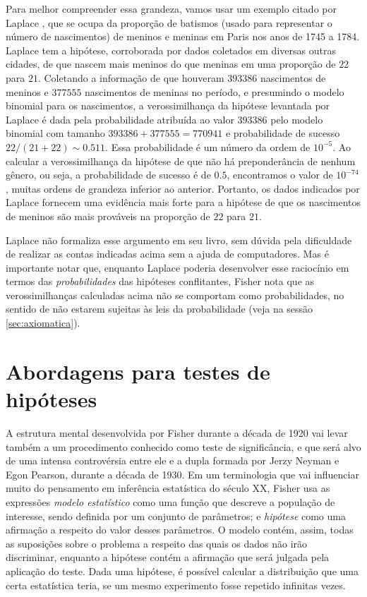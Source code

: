 Para melhor compreender essa grandeza, vamos usar um exemplo citado por Laplace \citep{Laplace1814}, que se ocupa da 
proporção de batismos (usado para representar o número de nascimentos) de meninos e meninas em Paris nos anos 
de 1745 a 1784. Laplace tem a hipótese, corroborada por dados coletados em diversas outras cidades, de que nascem mais meninos
do que meninas em uma proporção de $22$ para $21$. Coletando a informação de que houveram $393386$ nascimentos de 
meninos e $377555$
nascimentos de meninas no período, e presumindo o modelo binomial para os nascimentos, a verossimilhança da hipótese levantada
por Laplace é dada pela probabilidade atribuída ao valor $393386$ pelo modelo binomial com tamanho $393386 + 377555 = 770941$
e probabilidade de sucesso $22/(21+22) \sim 0.511$. Essa probabilidade é um número da ordem de $10^{-5}$. Ao calcular a 
verossimilhança da hipótese de que não há preponderância de nenhum gênero, ou seja, a probabilidade de sucesso é de $0.5$, 
encontramos o valor de $10^{-74}$, muitas ordens de grandeza inferior ao anterior. Portanto, os dados indicados por Laplace
fornecem uma evidência mais forte para a hipótese de que os nascimentos de meninos são mais prováveis na proporção de $22$
para $21$.

Laplace não formaliza esse argumento em seu livro, sem dúvida pela dificuldade de realizar as contas indicadas acima sem
a ajuda de computadores. Mas é importante notar que, enquanto Laplace poderia desenvolver esse raciocínio em termos das 
{\em probabilidades} das hipóteses conflitantes, Fisher nota que as verossimilhanças calculadas acima não se comportam como 
probabilidades, no sentido de não estarem sujeitas às leis da probabilidade (veja na sessão \ref{sec:axiomatica}).

\section{Abordagens para testes de hipóteses}

A estrutura mental desenvolvida por Fisher durante a década de 1920 vai levar também a um procedimento conhecido como teste de 
significância, e que será alvo de uma intensa controvérsia entre ele e a dupla formada por Jerzy Neyman e Egon Pearson, 
durante a década de 1930. Em um terminologia que vai influenciar muito do pensamento em inferência estatística do século XX,
Fisher usa as expressões {\em modelo estatístico} como uma função que descreve a população de interesse, sendo definida 
por um conjunto de parâmetros; e {\em hipótese} como uma afirmação a respeito do valor desses parâmetros. O modelo contém, 
assim, todas as suposições sobre o problema a respeito das quais os dados não irão discriminar, enquanto a hipótese
contém a afirmação que será julgada pela aplicação do teste. Dada uma hipótese, é possível
calcular a distribuição que uma certa estatística teria, se um mesmo experimento fosse repetido infinitas vezes.

